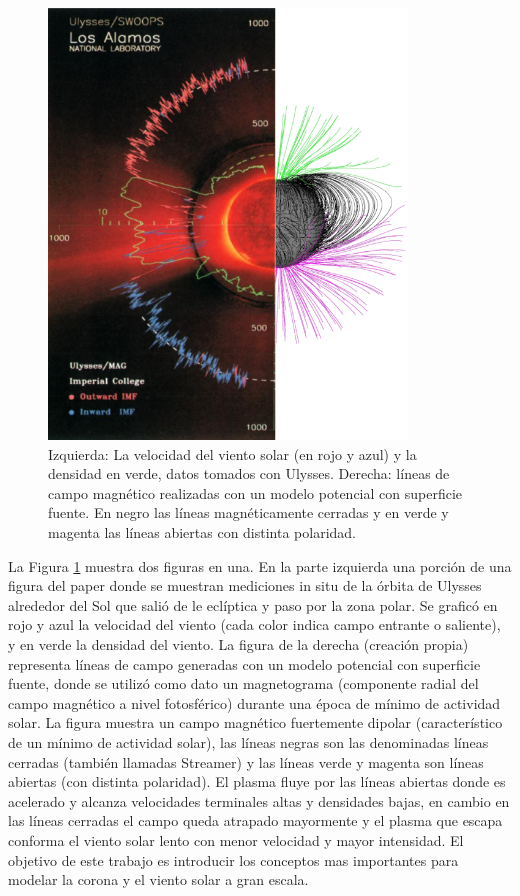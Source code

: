 \documentclass[a4paper,11pt]{report}
\begin{document}
\begin{figure}[ht]
\begin{center}
\includegraphics[width=0.85\textwidth]{figuras/mezcla_pfss_ulysses.png}
\end{center}
\caption{Izquierda: La velocidad del viento solar (en rojo y azul) y la densidad en verde, datos tomados con Ulysses. Derecha: líneas de campo magnético realizadas con un modelo potencial con superficie fuente. En negro las líneas magnéticamente cerradas y en verde y magenta las líneas abiertas con distinta polaridad.}
\label{ulysses}
\end{figure}

La Figura \ref{ulysses} muestra dos figuras en una. En la parte izquierda una porción de una figura del paper \citet{mccomas_2000} donde se muestran mediciones in situ de la órbita de Ulysses alrededor del Sol que salió de le eclíptica y paso por la zona polar. Se graficó en rojo y azul la velocidad del viento (cada color indica campo entrante o saliente), y en verde la densidad del viento. La figura de la derecha (creación propia) representa líneas de campo generadas con un modelo potencial con superficie fuente, donde se utilizó como dato un magnetograma (componente radial del campo magnético a nivel fotosférico) durante una época de mínimo de actividad solar. La figura muestra un campo magnético fuertemente dipolar (característico de un mínimo de actividad solar), las líneas negras son las denominadas líneas cerradas (también llamadas Streamer) y las líneas verde y magenta son líneas abiertas (con distinta polaridad). El plasma fluye por las líneas abiertas donde es acelerado y alcanza velocidades terminales altas y densidades bajas, en cambio en las líneas cerradas el campo queda atrapado mayormente y el plasma que escapa conforma el viento solar lento con menor velocidad y mayor intensidad. El objetivo de este trabajo es introducir los conceptos mas importantes para modelar la corona y el viento solar a gran escala.
\end{document}
